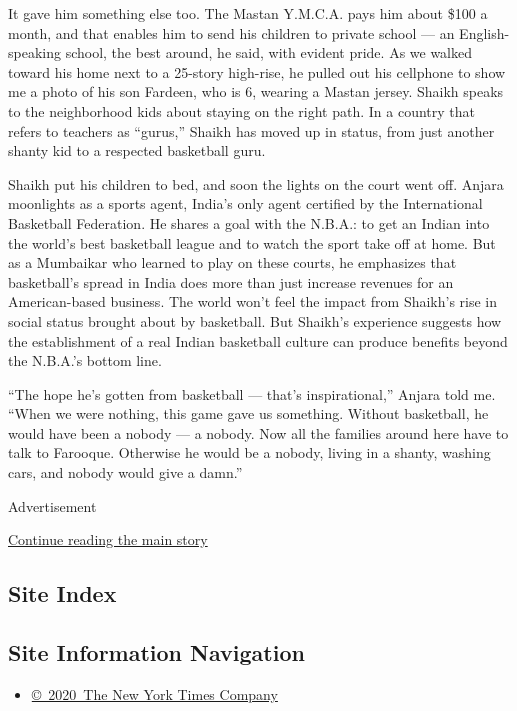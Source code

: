 It gave him something else too. The Mastan Y.M.C.A. pays him about \$100
a month, and that enables him to send his children to private school ---
an English-speaking school, the best around, he said, with evident
pride. As we walked toward his home next to a 25-story high-rise, he
pulled out his cellphone to show me a photo of his son Fardeen, who is
6, wearing a Mastan jersey. Shaikh speaks to the neighborhood kids about
staying on the right path. In a country that refers to teachers as
``gurus,'' Shaikh has moved up in status, from just another shanty kid
to a respected basketball guru.

Shaikh put his children to bed, and soon the lights on the court went
off. Anjara moonlights as a sports agent, India's only agent certified
by the International Basketball Federation. He shares a goal with the
N.B.A.: to get an Indian into the world's best basketball league and to
watch the sport take off at home. But as a Mumbaikar who learned to play
on these courts, he emphasizes that basketball's spread in India does
more than just increase revenues for an American-based business. The
world won't feel the impact from Shaikh's rise in social status brought
about by basketball. But Shaikh's experience suggests how the
establishment of a real Indian basketball culture can produce benefits
beyond the N.B.A.'s bottom line.

``The hope he's gotten from basketball --- that's inspirational,''
Anjara told me. ``When we were nothing, this game gave us something.
Without basketball, he would have been a nobody --- a nobody. Now all
the families around here have to talk to Farooque. Otherwise he would be
a nobody, living in a shanty, washing cars, and nobody would give a
damn.''

Advertisement

\protect\hyperlink{after-bottom}{Continue reading the main story}

\hypertarget{site-index}{%
\subsection{Site Index}\label{site-index}}

\hypertarget{site-information-navigation}{%
\subsection{Site Information
Navigation}\label{site-information-navigation}}

\begin{itemize}
\tightlist
\item
  \href{https://help.nytimes3xbfgragh.onion/hc/en-us/articles/115014792127-Copyright-notice}{©~2020~The
  New York Times Company}
\end{itemize}

